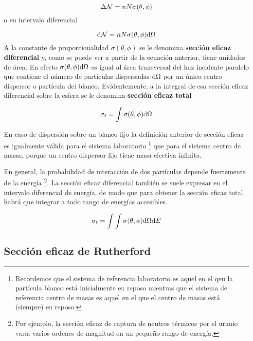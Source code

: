 \begin{equation}
	\Delta \mathcal{N} = n N \sigma (\theta,\phi)
\end{equation}
o en intervalo diferencial

\begin{equation}
	\mathrm{d} \mathcal{N} = n N \sigma (\theta,\phi) \mathrm{d} \Omega
\end{equation}
A la constante de proporcionalidad $\sigma(\theta,\phi)$ se le denomina \textbf{sección eficaz diferencial} y, como se puede ver a partir de la ecuación anterior, tiene unidades de área. En efecto $\sigma (\theta,\phi)\mathrm{d} \Omega$ es igual al área transversal del haz incidente paralelo que contiene el número de partículas dispersadas $\mathrm{d} \Omega$ por un único centro dispersor  o partícula del blanco. Evidentemente, a la integral de esa sección eficaz diferencial sobre la esfera se le denomina \textbf{sección eficaz total}

\begin{equation}
	\sigma_t = \int \sigma (\theta,\phi) \mathrm{d} \Omega
\end{equation}

En caso de dispersión sobre un blanco fijo la definición anterior de sección eficaz es igualmente válida para el sistema laboratorio \footnote{Recordemos que el sistema de referencia laboratorio es aquel en el qeu la partícula blanco está inicialmente en reposo mientras que el sistema de referencia centro de masas es aquel en el que el centro de masas está (siempre) en reposo.} que para el sistema centro de masas, porque un centro dispersor fijo tiene masa efectiva infinita.

En general, la probabilidad de interacción de dos partículas depende fuertemente de la energía \footnote{Por ejemplo, la sección eficaz de captura de neutros térmicos por el uranio varía varios ordenes de magnitud en un pequeño rango de energía.}. La sección eficaz diferencial también se suele expresar en el intervalo diferencial de energía, de modo que para obtener la sección eficaz total habrá que integrar a todo rango de energías accesibles.

\begin{equation}
	\sigma_t = \int \int \sigma(\theta,\phi) \mathrm{d} \Omega \mathrm{d} E
\end{equation}

\subsection{Sección eficaz de Rutherford}

